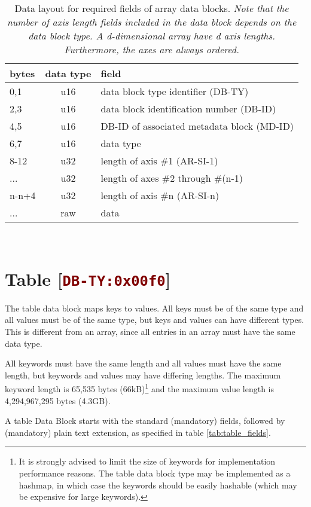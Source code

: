 \documentclass[pagesize=a4]{tufte-book}
\newcommand{\hlred}[1]{\textcolor{Maroon}{#1}}%
\newcommand{\hex}[1]{\hlred{\texttt{#1}}}%
\begin{document}
\begin{table}[ht]
	\centering
	\selectfont
	\begin{tabular}{lcl}
		\toprule
		bytes & data type & field\\
		\midrule
		0,1 & u16 & data block type identifier (DB-TY)\\
		2,3 & u16 & data block identification number (DB-ID)\\
		4,5 & u16 & DB-ID of associated metadata block (MD-ID)\\
		6,7 & u16 & data type\\
 		8-12 & u32 & length of axis \#1 (AR-SI-1)\\
 		...	& u32 & length of axes \#2 through \#(n-1)\\
 		n-n+4 & u32 & length of axis \#n (AR-SI-n)\\
 		... & raw & data\\
		\bottomrule
	\end{tabular}
	~\label{tab:array_text_fields}
	\caption[Data layout for required fields of array data blocks]{Data layout for required fields of array data blocks. \emph{Note that the number of axis length fields included in the data block depends on the data block type. A d-dimensional array  have d axis lengths. Furthermore, the axes are always ordered.}}	
\end{table}
\vspace{5mm}

\section{Table [\hex{DB-TY:0x00f0}]}
\label{DBTY:0x00f0}
The table data block maps keys to values. All keys must be of the same type and all values must be of the same type, but keys and values can have different types. This is different from an array, since all entries in an array must have the same data type.

All keywords must have the same length and all values must have the same length, but keywords and values may have differing lengths. The maximum keyword length is 65,535 bytes (66kB)\footnote{It is strongly advised to limit the size of keywords for implementation performance reasons. The table data block type may be implemented as a hashmap, in which case the keywords should be easily hashable (which may be expensive for large keywords).} and the maximum value length is 4,294,967,295 bytes (4.3GB).

A table Data Block starts with the standard (mandatory) fields, followed by (mandatory) plain text extension, as specified in table \ref{tab:table_fields}.
\end{document}
